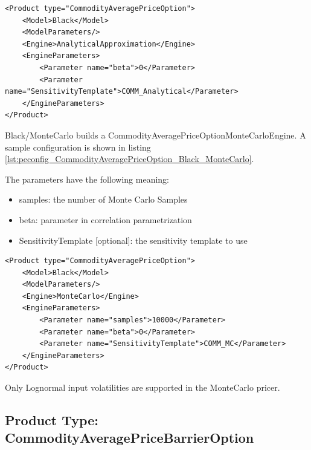 \begin{longlisting}
\begin{verbatim}
<Product type="CommodityAveragePriceOption">
    <Model>Black</Model>
    <ModelParameters/>
    <Engine>AnalyticalApproximation</Engine>
    <EngineParameters>
        <Parameter name="beta">0</Parameter>
        <Parameter name="SensitivityTemplate">COMM_Analytical</Parameter>
    </EngineParameters>
</Product>
\end{verbatim}
\caption{Configuration for Product CommodityAveragePriceOption, Model Black, Engine AnalyticalApproximation}
\label{lst:peconfig_CommodityAveragePriceOption_Black_AnalyticalApproximation}
\end{longlisting}

Black/MonteCarlo builds a CommodityAveragePriceOptionMonteCarloEngine. A sample configuration is shown in listing
\ref{lst:peconfig_CommodityAveragePriceOption_Black_MonteCarlo}.

The parameters have the following meaning:

\begin{itemize}
\item samples: the number of Monte Carlo Samples
\item beta: parameter in correlation parametrization
\item SensitivityTemplate [optional]: the sensitivity template to use
\end{itemize}

\begin{longlisting}
\begin{verbatim}
<Product type="CommodityAveragePriceOption">
    <Model>Black</Model>
    <ModelParameters/>
    <Engine>MonteCarlo</Engine>
    <EngineParameters>
        <Parameter name="samples">10000</Parameter>
        <Parameter name="beta">0</Parameter>
        <Parameter name="SensitivityTemplate">COMM_MC</Parameter>
    </EngineParameters>
</Product>
\end{verbatim}
\caption{Configuration for Product CommodityAveragePriceOption, Model Black, Engine MonteCarlo}
\label{lst:peconfig_CommodityAveragePriceOption_Black_MonteCarlo}
\end{longlisting}

Only Lognormal input volatilities are supported in the MonteCarlo pricer.

\subsection{Product Type: CommodityAveragePriceBarrierOption}

